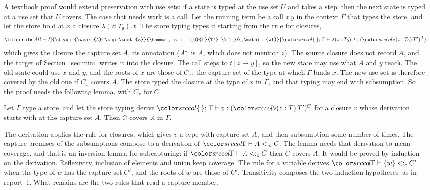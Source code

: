 A textbook proof would extend preservation \cite{wright1994syntactic,pierce2002tapl} with use sets: if a state is typed at the use set $U$ and takes a step, then the next state is typed at a use set that $U$ covers. The case that needs work is a call. Let the running term be a call $x\,y$ in the context $\Gamma$ that types the store, and let the store hold at $x$ a closure $\lambda(z : T_0).\,t$. The store typing types it starting from the rule for closures,
\[
\inferrule[All-I]{\dtyuj{\weak{A} \cup \cset{z}}{\Gamma, z : T_0}{t}{T'} \\ T_0\ \mathit{wf}}{\dtyuj{\cempty}{\Gamma}{\lambda(z : T_0).\,t}{\capt{(\dall{z}{T_0}{T'})}{A}}}
\]
which gives the closure the capture set $A$, its annotation ($A{\uparrow}$ is $A$, which does not mention $z$). The source closure does not record $A$, and the target of Section~\ref{sec:mini} writes it into the closure. The call steps to $t[z \mapsto y]$, so the new state may use what $A$ and $y$ reach. The old state could use $x$ and $y$, and the roots of $x$ are those of $C_x$, the capture set of the type at which $\Gamma$ binds $x$. The new use set is therefore covered by the old one if $C_x$ covers $A$. The store typed the closure at the type of $x$ in $\Gamma$, and that typing may end with subsumption. So the proof needs the following lemma, with $C_x$ for $C$.

\begin{lemma}\label{lem:problem-call}
Let $\Gamma$ type a store, and let the store typing derive $\dtyuj{\cempty}{\Gamma}{v}{\capt{(\dall{z}{T}{T'})}{C}}$ for a closure $v$ whose derivation starts with  at the capture set $A$. Then $C$ covers $A$ in $\Gamma$.
\end{lemma}

The derivation applies the rule for closures, which gives $v$ a type with capture set $A$, and then subsumption some number of times. The capture premises of the subsumptions compose to a derivation of $\subcj{\Gamma}{A}{C}$. The lemma needs that derivation to mean coverage, and that is an inversion lemma for subcapturing: if $\subcj{\Gamma}{A}{C}$ then $C$ covers $A$. It would be proved by induction on the derivation. Reflexivity, inclusion of elements and union keep coverage. The rule for a variable derives $\subcj{\Gamma}{\cset{w}}{C'}$ when the type of $w$ has the capture set $C'$, and the roots of $w$ are those of $C'$. Transitivity composes the two induction hypotheses, as in report~1. What remains are the two rules that read a capture member.


